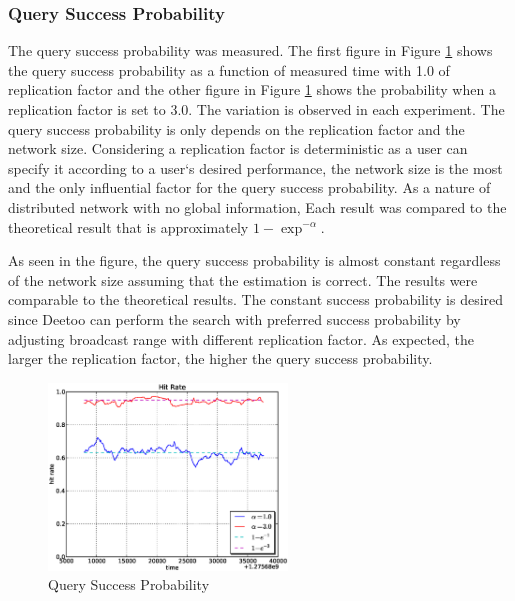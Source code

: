 \documentclass[9.5pt,journal,final,finalsubmission,twocolumn]{IEEEtran}
\begin{document}
\subsubsection{Query Success Probability}
The query success probability was measured. The first figure in 
Figure \ref{fig:plab_hit}
shows the query success probability as a function of measured time with
1.0 of replication factor and the other figure in Figure \ref{fig:plab_hit} 
shows the
probability when a replication factor is set to 3.0.
The variation is observed in each experiment. The query success 
probability is only depends on the replication factor and the 
network size. 
Considering a replication factor is deterministic as a user can specify it 
according to a user`s desired performance, 
the network size is the most and the only influential factor 
for the query success probability. 
As a nature of distributed network with no global information, 
Each result was compared to the theoretical result that is approximately
$1-\exp^{-\alpha}$.
 
As seen in the figure, the query success probability is almost constant 
regardless of the network size assuming that the estimation is correct.
The results were comparable to the theoretical results.
The constant success probability is desired since Deetoo can perform 
the search with preferred success probability by
adjusting broadcast range with different replication factor.
As expected, the larger the replication factor, the higher the query 
success probability.
\begin{figure}[ht]
\centering
\includegraphics[width=2.5in]{plab_hit}
\caption{Query Success Probability}
\label{fig:plab_hit}
\end{figure}
\end{document}
